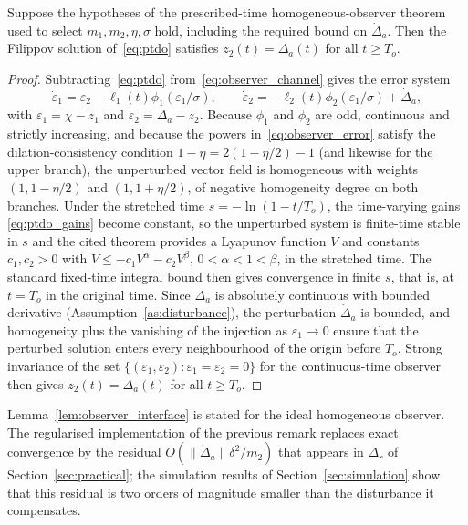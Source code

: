 \begin{lemma}\label{lem:observer_interface}
Suppose the hypotheses of the prescribed-time homogeneous-observer theorem
used to select $m_1,m_2,\eta,\sigma$ hold, including the required bound on
$\dot\Delta_a$. Then the Filippov solution of~\eqref{eq:ptdo} satisfies
$z_2(t)=\Delta_a(t)$ for all $t\geq T_o$.
\end{lemma}
\begin{proof}
Subtracting~\eqref{eq:ptdo} from~\eqref{eq:observer_channel} gives the error
system
\begin{equation}
 \dot\varepsilon_1=\varepsilon_2-\ell_1(t)\phi_1(\varepsilon_1/\sigma),\qquad
 \dot\varepsilon_2=-\ell_2(t)\phi_2(\varepsilon_1/\sigma)+\dot\Delta_a,
 \label{eq:observer_error}
\end{equation}
with $\varepsilon_1=\chi-z_1$ and $\varepsilon_2=\Delta_a-z_2$. Because
$\phi_1$ and $\phi_2$ are odd, continuous and strictly increasing, and because
the powers in~\eqref{eq:observer_error} satisfy the dilation-consistency
condition $1-\eta=2(1-\eta/2)-1$ (and likewise for the upper branch), the
unperturbed vector field is homogeneous with weights $(1,1-\eta/2)$ and
$(1,1+\eta/2)$, of negative homogeneity degree on both branches. Under the
stretched time $s=-\ln(1-t/T_o)$, the time-varying gains
\eqref{eq:ptdo_gains} become constant, so the unperturbed system is finite-time
stable in $s$ and the cited theorem provides a Lyapunov function $V$ and
constants $c_1,c_2>0$ with $\dot V\leq-c_1V^{\alpha}-c_2V^{\beta}$,
$0<\alpha<1<\beta$, in the stretched time. The standard fixed-time integral
bound then gives convergence in finite $s$, that is, at $t=T_o$ in the original
time. Since $\Delta_a$ is absolutely continuous with bounded derivative
(Assumption~\ref{as:disturbance}), the perturbation $\dot\Delta_a$ is bounded,
and homogeneity plus the vanishing of the injection as $\varepsilon_1\to0$
ensure that the perturbed solution enters every neighbourhood of the origin
before $T_o$. Strong invariance of the set
$\{(\varepsilon_1,\varepsilon_2):\varepsilon_1=\varepsilon_2=0\}$ for the
continuous-time observer then gives $z_2(t)=\Delta_a(t)$ for all $t\geq T_o$.
\end{proof}
\begin{remark}
Lemma~\ref{lem:observer_interface} is stated for the ideal homogeneous observer.
The regularised implementation of the previous remark replaces exact
convergence by the residual $O(\|\dot\Delta_a\|\delta^2/m_2)$ that appears in
$\Delta_r$ of Section~\ref{sec:practical}; the simulation results of
Section~\ref{sec:simulation} show that this residual is two orders of magnitude
smaller than the disturbance it compensates.
\end{remark}

